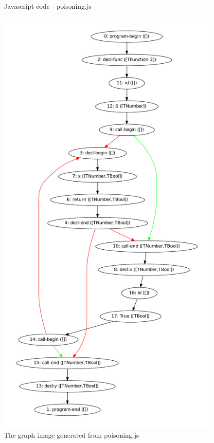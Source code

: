 \documentclass[a4paper,10pt]{article}
\begin{document}
 \begin{figure}[h!]
  
 \caption{Javascript code - poisoning.js}
 \label{poisoningCode}
 \end{figure}
 
 \begin{figure}
 	\begin{center}
 	\includegraphics[height=\textheight]{../examples/poisoning.pdf}
 	\caption{The graph image generated from poisoning.js}
 	\label{poisoningGraph}
	\end{center}
 \end{figure}
\end{document}
